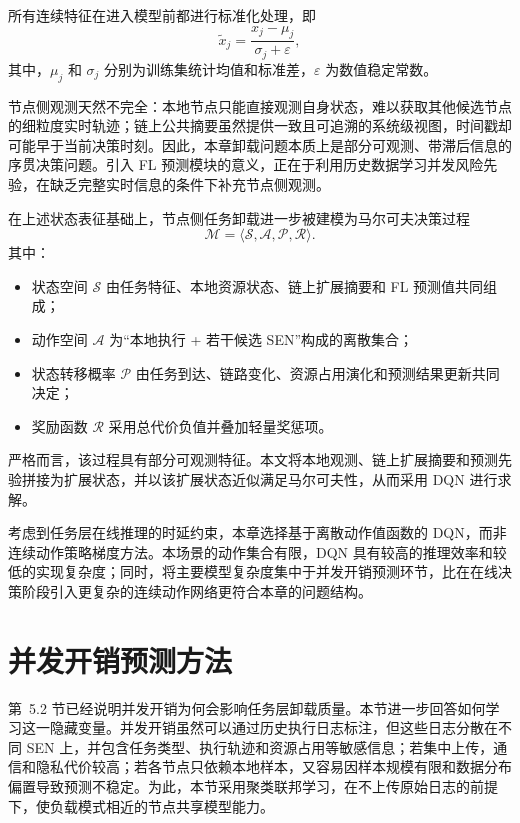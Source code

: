 所有连续特征在进入模型前都进行标准化处理，即
\begin{equation}
    \tilde{x}_j = \frac{x_j - \mu_j}{\sigma_j + \varepsilon},
    \label{eq:ch5_normalize}
\end{equation}
其中，$\mu_j$ 和 $\sigma_j$ 分别为训练集统计均值和标准差，$\varepsilon$ 为数值稳定常数。

节点侧观测天然不完全：本地节点只能直接观测自身状态，难以获取其他候选节点的细粒度实时轨迹；链上公共摘要虽然提供一致且可追溯的系统级视图，时间戳却可能早于当前决策时刻。因此，本章卸载问题本质上是部分可观测、带滞后信息的序贯决策问题。引入 FL 预测模块的意义，正在于利用历史数据学习并发风险先验，在缺乏完整实时信息的条件下补充节点侧观测。

在上述状态表征基础上，节点侧任务卸载进一步被建模为马尔可夫决策过程
\begin{equation}
    \mathcal{M} = \langle \mathcal{S}, \mathcal{A}, \mathcal{P}, \mathcal{R} \rangle.
\end{equation}
其中：
\begin{itemize}[leftmargin=2.5em]
    \item 状态空间 $\mathcal{S}$ 由任务特征、本地资源状态、链上扩展摘要和 FL 预测值共同组成；
    \item 动作空间 $\mathcal{A}$ 为“本地执行 + 若干候选 SEN”构成的离散集合；
    \item 状态转移概率 $\mathcal{P}$ 由任务到达、链路变化、资源占用演化和预测结果更新共同决定；
    \item 奖励函数 $\mathcal{R}$ 采用总代价负值并叠加轻量奖惩项。
\end{itemize}

严格而言，该过程具有部分可观测特征。本文将本地观测、链上扩展摘要和预测先验拼接为扩展状态，并以该扩展状态近似满足马尔可夫性，从而采用 DQN 进行求解。

考虑到任务层在线推理的时延约束，本章选择基于离散动作值函数的 DQN，而非连续动作策略梯度方法。本场景的动作集合有限，DQN 具有较高的推理效率和较低的实现复杂度；同时，将主要模型复杂度集中于并发开销预测环节，比在在线决策阶段引入更复杂的连续动作网络更符合本章的问题结构。

\section{并发开销预测方法}
\label{sec:ch5_fl_prediction}
第~5.2 节已经说明并发开销为何会影响任务层卸载质量。本节进一步回答如何学习这一隐藏变量。并发开销虽然可以通过历史执行日志标注，但这些日志分散在不同 SEN 上，并包含任务类型、执行轨迹和资源占用等敏感信息；若集中上传，通信和隐私代价较高；若各节点只依赖本地样本，又容易因样本规模有限和数据分布偏置导致预测不稳定。为此，本节采用聚类联邦学习，在不上传原始日志的前提下，使负载模式相近的节点共享模型能力。

